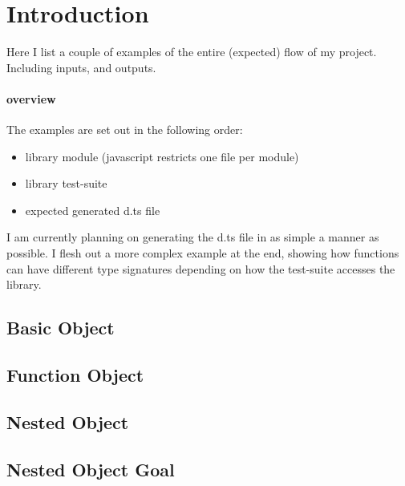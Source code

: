 \documentclass[12pt]{article}
\begin{document}
\section*{Introduction}
Here I list a couple of examples of the entire (expected) flow of my project.
Including inputs, and outputs.

\paragraph{overview} The examples are set out in the following order:
\begin{itemize}
\item library module (javascript restricts one file per module)
\item library test-suite
\item expected generated d.ts file
\end{itemize}

I am currently planning on generating the d.ts file in as simple a manner as
possible. I flesh out a more complex example at the end, showing how functions
can have different type signatures depending on how the test-suite accesses the library.



\clearpage
\subsection{Basic Object}





\clearpage
\subsection{Function Object}





\clearpage
\subsection{Nested Object}





\clearpage
\subsection{Nested Object Goal}
\end{document}
